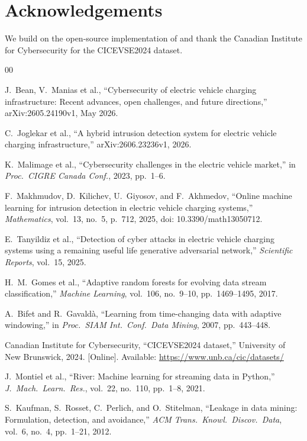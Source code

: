 \documentclass[preprint,12pt]{elsarticle}
\begin{document}
\section*{Acknowledgements}

We build on the open-source implementation of \cite{b4} and thank the Canadian Institute for Cybersecurity for the CICEVSE2024 dataset.

\begin{thebibliography}{00}

 J.\ Bean, V.\ Manias et al., ``Cybersecurity of electric vehicle charging infrastructure: Recent advances, open challenges, and future directions,'' arXiv:2605.24190v1, May 2026.

 C.\ Joglekar et al., ``A hybrid intrusion detection system for electric vehicle charging infrastructure,'' arXiv:2606.23236v1, 2026.

 K.\ Malimage et al., ``Cybersecurity challenges in the electric vehicle market,'' in \emph{Proc.\ CIGRE Canada Conf.}, 2023, pp.\ 1--6.

 F.\ Makhmudov, D.\ Kilichev, U.\ Giyosov, and F.\ Akhmedov, ``Online machine learning for intrusion detection in electric vehicle charging systems,'' \emph{Mathematics}, vol.\ 13, no.\ 5, p.\ 712, 2025, doi: 10.3390/math13050712.

 E.\ Tanyildiz et al., ``Detection of cyber attacks in electric vehicle charging systems using a remaining useful life generative adversarial network,'' \emph{Scientific Reports}, vol.\ 15, 2025.

 H.\ M.\ Gomes et al., ``Adaptive random forests for evolving data stream classification,'' \emph{Machine Learning}, vol.\ 106, no.\ 9--10, pp.\ 1469--1495, 2017.

 A.\ Bifet and R.\ Gavald\`{a}, ``Learning from time-changing data with adaptive windowing,'' in \emph{Proc.\ SIAM Int.\ Conf.\ Data Mining}, 2007, pp.\ 443--448.

 Canadian Institute for Cybersecurity, ``CICEVSE2024 dataset,'' University of New Brunswick, 2024. [Online]. Available: \url{https://www.unb.ca/cic/datasets/}

 J.\ Montiel et al., ``River: Machine learning for streaming data in Python,'' \emph{J.\ Mach.\ Learn.\ Res.}, vol.\ 22, no.\ 110, pp.\ 1--8, 2021.

 S.\ Kaufman, S.\ Rosset, C.\ Perlich, and O.\ Stitelman, ``Leakage in data mining: Formulation, detection, and avoidance,'' \emph{ACM Trans.\ Knowl.\ Discov.\ Data}, vol.\ 6, no.\ 4, pp.\ 1--21, 2012.


\end{thebibliography}
\end{document}
